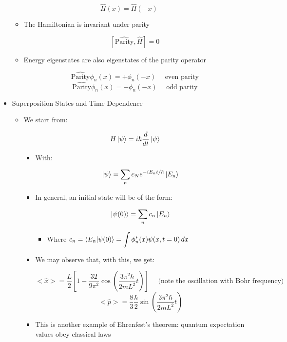 \begin{itemize}
    $$\hat{H}(x)=\hat{H}(-x)$$

    \begin{itemize}

      \item The Hamiltonian is invariant under parity

        $$[\hat{\text{Parity}},\hat{H}]=0$$

      \item Energy eigenstates are also eigenstates of the parity operator

        $$\hat{\text{Parity}}\phi_n(x)=+\phi_n(-x)\quad \text{ even parity}$$
        $$\hat{\text{Parity}}\phi_n(x)=-\phi_n(-x)\quad \text{ odd parity}$$

    \end{itemize}

  \item Superposition States and Time-Dependence

    \begin{itemize}

      \item We start from:

        $$H\ket{\psi}=i\hbar\frac{d}{dt}\ket{\psi}$$

        \begin{itemize}

          \item With:

            $$\ket{\psi}=\sum_n c_Ne^{-iE_nt/\hbar}\ket{E_n}$$

          \item In general, an initial state will be of the form:

            $$\ket{\psi(0)}=\sum_nc_n\ket{E_n}$$
            
            \begin{itemize}

              \item Where $c_n=\bra{E_n}\ket{\psi(0)}=\displaystyle \int \phi^*_n(x)\psi(x,t=0)\,dx$

            \end{itemize}
          
          \item We may observe that, with this, we get:

            $$<\hat{x}>=\frac{L}{2}\left[ 1-\frac{32}{9\pi^2}\cos\left( \frac{3\pi^2\hbar}{2mL^2}t \right) \right]\quad \text{ (note the oscillation with Bohr frequency)}$$
            $$<\hat{p}>=\frac{8}{3}\frac{\hbar}{2}\sin\left( \frac{3\pi^2\hbar}{2mL^2}t \right)$$

          \item This is another example of Ehrenfest's theorem: quantum expectation values obey classical laws

        \end{itemize}

    \end{itemize}

\end{itemize}




